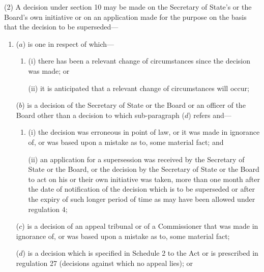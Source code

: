 \documentclass[12pt,a4paper]{article}
\begin{document}
(2) A decision under section 10 may be made on the Secretary of State’s 
or the Board's  %
own initiative or on an application made for the purpose on the basis that the decision to be superseded—
\begin{enumerate}\item[]
($a$) is one in respect of which—
\begin{enumerate}\item[]
(i) there has been a relevant change of circumstances since the decision was made; or

(ii) it is anticipated that a relevant change of circumstances will occur;
\end{enumerate}

($b$) is a decision of the Secretary of State 
or the Board or an officer of the Board  %
other than a decision to which sub-paragraph ($d$) refers and—
\begin{enumerate}\item[]
(i) the decision was erroneous in point of law, or it was made in ignorance of, or was based upon a mistake as to, some material fact; and

(ii) an application for a supersession was received by the Secretary of State
or the Board,  %
or the decision by the Secretary of State 
or the Board  %
to act on his 
or their  %
own initiative was taken, more than one month after the date of notification of the decision which is to be superseded or after the expiry of such longer period of time as may have been allowed under regulation 4;
\end{enumerate}

($c$) is a decision of an appeal tribunal or of a Commissioner that was made in ignorance of, or was based upon a mistake as to, some material fact;

($d$) is a decision which is specified in Schedule 2 to the Act or is prescribed in regulation 27 (decisions against which no appeal lies); or

%


\end{enumerate}
\end{document}
